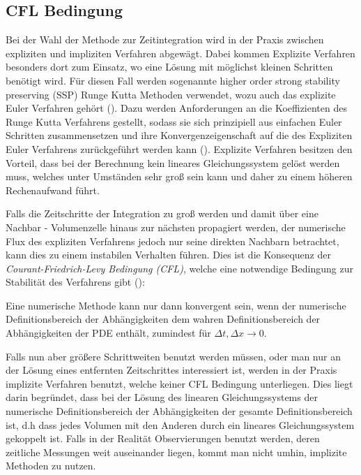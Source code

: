 \subsection{CFL Bedingung}
Bei der Wahl der Methode zur Zeitintegration wird in der Praxis zwischen expliziten und impliziten Verfahren abgewägt. Dabei kommen Explizite Verfahren besonders dort zum Einsatz, wo eine Lösung mit möglichst kleinen Schritten benötigt wird. Für diesen Fall werden sogenannte higher order strong stability preserving (SSP) Runge Kutta Methoden verwendet, wozu auch das explizite Euler Verfahren gehört (\cite{gottlieb2003strong}). Dazu werden Anforderungen an die Koeffizienten des Runge Kutta Verfahrens gestellt, sodass sie sich prinzipiell aus einfachen Euler Schritten zusammensetzen und ihre Konvergenzeigenschaft auf die des Expliziten Euler Verfahrens zurückgeführt werden kann (\cite[Lemma 1.1]{gottlieb2003strong}). Explizite Verfahren besitzen den Vorteil, dass bei der Berechnung kein lineares Gleichungssystem gelöst werden muss, welches unter Umständen sehr groß sein kann und daher zu einem höheren Rechenaufwand führt.

Falls die Zeitschritte der Integration zu groß werden und damit über eine Nachbar - Volumenzelle hinaus zur nächsten propagiert werden, der numerische Flux des expliziten Verfahrens jedoch nur seine direkten Nachbarn betrachtet, kann dies zu einem instabilen Verhalten führen. Dies ist die Konsequenz der \textit{Courant-Friedrich-Levy Bedingung (CFL)}, welche eine notwendige Bedingung zur Stabilität des Verfahrens gibt (\cite[S.69]{leveque2002finite}):
\begin{theorem*}
  Eine numerische Methode kann nur dann konvergent sein, wenn der numerische Definitionsbereich der Abhängigkeiten dem wahren Definitionsbereich der Abhängigkeiten der PDE enthält, zumindest für $\Delta t, \Delta x\to 0$.
\end{theorem*}

Falls nun aber größere Schrittweiten benutzt werden müssen, oder man nur an der Lösung eines entfernten Zeitschrittes interessiert ist, werden in der Praxis implizite Verfahren benutzt, welche keiner CFL Bedingung unterliegen. Dies liegt darin begründet, dass bei der Lösung des linearen Gleichungssystems der numerische Definitionsbereich der Abhängigkeiten der gesamte Definitionsbereich ist, d.h dass jedes Volumen mit den Anderen durch ein lineares Gleichungssystem gekoppelt ist. Falls in der Realität Observierungen benutzt werden, deren zeitliche Messungen weit auseinander liegen, kommt man nicht umhin, implizite Methoden zu nutzen.

